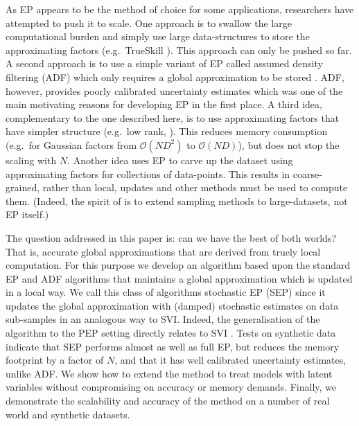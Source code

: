 As EP appears to be the method of choice for some applications, researchers have attempted to push it to scale. One approach is to swallow the large computational burden and simply use large data-structures to store the approximating factors (e.g.~TrueSkill \cite{herbrich:trueskill}). This approach can only be pushed so far. A second approach is to use a simple variant of EP called assumed density filtering (ADF) which only requires a global approximation to be stored \cite{maybeck:adf}. ADF, however, provides poorly calibrated uncertainty estimates \cite{minka:ep} which was one of the main motivating reasons for developing EP in the first place. 
A third idea, complementary to the one described here, is to use approximating factors that have simpler structure (e.g.~low rank, \cite{qi+minka:sparseGP}). This reduces memory consumption (e.g.~for Gaussian factors from $\mathcal{O}(ND^2)$ to $\mathcal{O}(ND)$), but does not stop the scaling with $N$. Another idea uses EP to carve up the dataset \cite{gelman:dep,xu:sms} using approximating factors for collections of data-points. This results in coarse-grained, rather than local, updates and other methods must be used to compute them. (Indeed, the spirit of \cite{gelman:dep,xu:sms} is to extend sampling methods to large-datasets, not EP itself.) 

The question addressed in this paper is: can we have the best of both worlds? That is, accurate global approximations that are derived from truely local computation. For this purpose we develop an algorithm based upon the standard EP and ADF algorithms that maintains a global approximation which is updated in a local way. We call this class of algorithms stochastic EP (SEP) since it updates the global approximation with (damped) stochastic estimates on data sub-samples in an analogous way to SVI. Indeed, the generalisation of the algorithm to the PEP setting directly relates to SVI \cite{hoffman:svi}. Tests on synthetic data indicate that SEP performs almost as well as full EP, but reduces the memory footprint by a factor of $N$, and that it has well calibrated uncertainty estimates, unlike ADF. We show how to extend the method to treat models with latent variables without compromising on accuracy or memory demands. Finally, we demonstrate the scalability and accuracy of the method on a number of real world and synthetic datasets.


